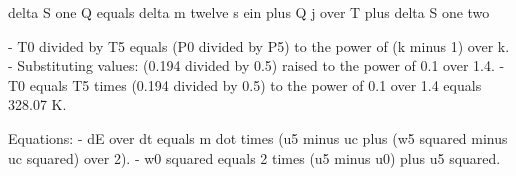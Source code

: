 delta S one Q equals delta m twelve s ein plus Q j over T plus delta S one two

- T0 divided by T5 equals (P0 divided by P5) to the power of (k minus 1) over k.
- Substituting values: (0.194 divided by 0.5) raised to the power of 0.1 over 1.4.
- T0 equals T5 times (0.194 divided by 0.5) to the power of 0.1 over 1.4 equals 328.07 K.

Equations:
- dE over dt equals m dot times (u5 minus uc plus (w5 squared minus uc squared) over 2).
- w0 squared equals 2 times (u5 minus u0) plus u5 squared.